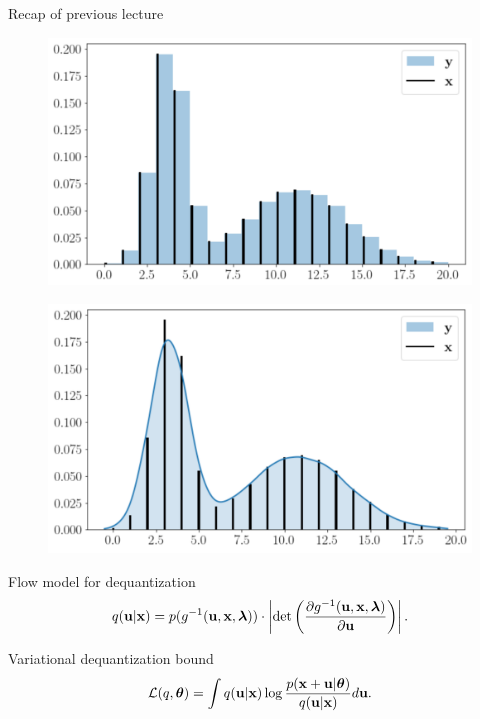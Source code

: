 \begin{frame}{Recap of previous lecture}

\begin{minipage}[t]{0.5\columnwidth}
	\begin{figure}
		\centering
		\includegraphics[width=1.0\linewidth]{figs/uniform_dequantization.png}
	\end{figure}
\end{minipage}%
\begin{minipage}[t]{0.5\columnwidth}
	\begin{figure}
		\centering
		\includegraphics[width=1.0\linewidth]{figs/variational_dequantization.png}
	\end{figure}
\end{minipage}
\begin{block}{Flow model for dequantization}
	\vspace{-0.3cm}
	\[
	q(\mathbf{u} | \mathbf{x}) = p(g^{-1}(\mathbf{u}, \mathbf{x}, \boldsymbol{\lambda})) \cdot \left| \det \left( \frac{\partial g^{-1}(\mathbf{u}, \mathbf{x}, \boldsymbol{\lambda})}{\partial \mathbf{u}} \right) \right|.
	\]
	\vspace{-0.3cm}
\end{block}
\begin{block}{Variational dequantization bound}
	\[
	\mathcal{L}(q, \boldsymbol{\theta}) = \int q(\mathbf{u} | \mathbf{x}) \log \frac{p(\mathbf{x} + \mathbf{u} | \boldsymbol{\theta})}{q(\mathbf{u} | \mathbf{x})} d \mathbf{u}.
	\]
\end{block}
\end{frame}
